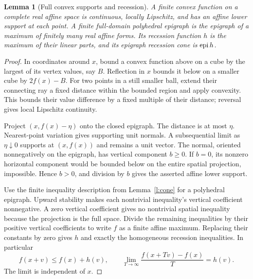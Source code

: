 \documentclass[11pt]{article}
\newtheorem{lemma}[theorem]{Lemma}
\theoremstyle{definition}\newtheorem{definition}[theorem]{Definition}
\theoremstyle{remark}\newtheorem{remark}[theorem]{Remark}
\begin{document}
\begin{lemma}[Full convex supports and recession]\label{l:support}
A finite convex function on a complete real affine space is continuous, locally Lipschitz, and has an affine lower support at each point. A finite full-domain polyhedral epigraph is the epigraph of a maximum of finitely many real affine forms. Its recession function $h$ is the maximum of their linear parts, and its epigraph recession cone is $\operatorname{epi} h$.
\end{lemma}
\begin{proof}
In coordinates around $x$, bound a convex function above on a cube by the largest of its vertex values, say $B$. Reflection in $x$ bounds it below on a smaller cube by $2f(x)-B$. For two points in a still smaller ball, extend their connecting ray a fixed distance within the bounded region and apply convexity. This bounds their value difference by a fixed multiple of their distance; reversal gives local Lipschitz continuity.

Project $(x,f(x)-\eta)$ onto the closed epigraph. The distance is at most $\eta$. Nearest-point variation gives supporting unit normals. A subsequential limit as $\eta\downarrow0$ supports at $(x,f(x))$ and remains a unit vector. The normal, oriented nonnegatively on the epigraph, has vertical component $b\geq0$. If $b=0$, its nonzero horizontal component would be bounded below on the entire spatial projection, impossible. Hence $b>0$, and division by $b$ gives the asserted affine lower support.

Use the finite inequality description from Lemma~\ref{l:cone} for a polyhedral epigraph. Upward stability makes each nontrivial inequality's vertical coefficient nonnegative. A zero vertical coefficient gives no nontrivial spatial inequality because the projection is the full space. Divide the remaining inequalities by their positive vertical coefficients to write $f$ as a finite affine maximum. Replacing their constants by zero gives $h$ and exactly the homogeneous recession inequalities. In particular
\[
 f(x+v)\leq f(x)+h(v),\qquad
 \lim_{T\to\infty}\frac{f(x+Tv)-f(x)}T=h(v).
\]
The limit is independent of $x$.
\end{proof}
\end{document}
